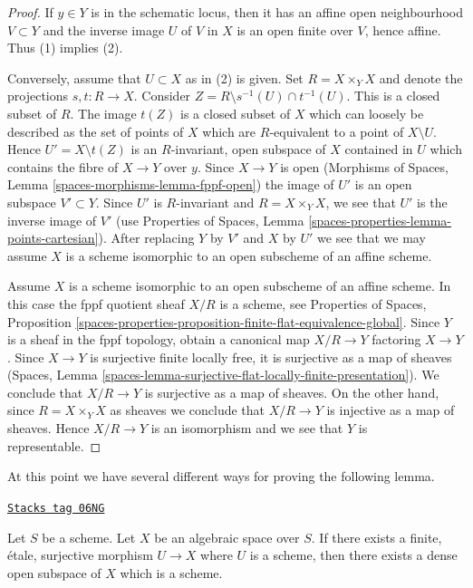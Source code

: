 \begin{proof}
If $y \in Y$ is in the schematic locus, then it has an affine open
neighbourhood $V \subset Y$ and the inverse image $U$ of $V$ in $X$
is an open finite over $V$, hence affine. Thus (1) implies (2).

\medskip\noindent
Conversely, assume that $U \subset X$ as in (2) is given.
Set $R = X \times_Y X$ and denote the projections $s, t : R \to X$.
Consider $Z = R \setminus s^{-1}(U) \cap t^{-1}(U)$.
This is a closed subset of $R$. The image $t(Z)$ is a closed
subset of $X$ which can loosely be described as the set of
points of $X$ which are $R$-equivalent to a point of
$X \setminus U$. Hence $U' = X \setminus t(Z)$ is an $R$-invariant,
open subspace of $X$ contained in $U$ which contains
the fibre of $X \to Y$ over $y$. Since $X \to Y$ is open
(Morphisms of Spaces, Lemma \ref{spaces-morphisms-lemma-fppf-open})
the image of $U'$ is an open subspace $V' \subset Y$.
Since $U'$ is $R$-invariant and $R = X \times_Y X$, we see that $U'$ is the
inverse image of $V'$ (use
Properties of Spaces, Lemma \ref{spaces-properties-lemma-points-cartesian}).
After replacing $Y$ by $V'$ and $X$ by $U'$ we see that we may assume
$X$ is a scheme isomorphic to an open subscheme of an affine scheme.

\medskip\noindent
Assume $X$ is a scheme isomorphic to an open subscheme of an affine scheme.
In this case the fppf quotient sheaf $X/R$ is a scheme, see
Properties of Spaces, Proposition
\ref{spaces-properties-proposition-finite-flat-equivalence-global}.
Since $Y$ is a sheaf in the fppf topology, obtain a canonical
map $X/R \to Y$ factoring $X \to Y$. Since $X \to Y$ is surjective
finite locally free, it is surjective as a map of sheaves
(Spaces, Lemma \ref{spaces-lemma-surjective-flat-locally-finite-presentation}).
We conclude that $X/R \to Y$ is surjective as a map of sheaves.
On the other hand, since $R = X \times_Y X$ as sheaves we conclude that
$X/R \to Y$ is injective as a map of sheaves. Hence $X/R \to Y$
is an isomorphism and we see that $Y$ is representable.
\end{proof}

At this point we have several different ways for proving the following
lemma.

\begin{lemma}
\label{decent-spaces-lemma-finite-etale-cover-dense-open-scheme}
\href{https://stacks.math.columbia.edu/tag/06NG}{\texttt{Stacks tag 06NG}}

Let $S$ be a scheme. Let $X$ be an algebraic space over $S$.
If there exists a finite, \'etale, surjective morphism
$U \to X$ where $U$ is a scheme, then there exists a dense open subspace
of $X$ which is a scheme.
\end{lemma}

